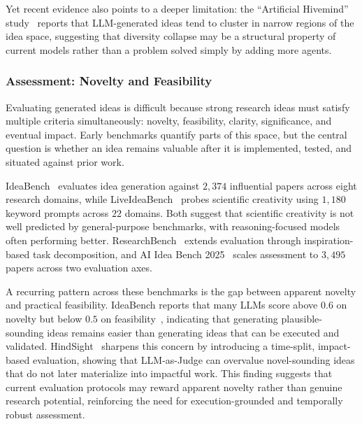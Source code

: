 \documentclass{llmxive}
\begin{document}
Yet recent evidence also points to a deeper limitation: the ``Artificial Hivemind'' study~\cite{jiang2025artificialhivemind} reports that LLM-generated ideas tend to cluster in narrow regions of the idea space, suggesting that diversity collapse may be a structural property of current models rather than a problem solved simply by adding more agents.



\subsubsection{Assessment: Novelty and Feasibility}
\label{sec:idea_eval}

Evaluating generated ideas is difficult because strong research ideas must satisfy multiple criteria simultaneously: novelty, feasibility, clarity, significance, and eventual impact. Early benchmarks quantify parts of this space, but the central question is whether an idea remains valuable after it is implemented, tested, and situated against prior work.

IdeaBench~\cite{guo2025ideabench} evaluates idea generation against $2{,}374$ influential papers across eight research domains, while LiveIdeaBench~\cite{liveideabench2024} probes scientific creativity using $1{,}180$ keyword prompts across $22$ domains. Both suggest that scientific creativity is not well predicted by general-purpose benchmarks, with reasoning-focused models often performing better. ResearchBench~\cite{researchbench2025} extends evaluation through inspiration-based task decomposition, and AI Idea Bench 2025~\cite{aiideabench2025} scales assessment to $3{,}495$ papers across two evaluation axes.

A recurring pattern across these benchmarks is the gap between apparent novelty and practical feasibility. IdeaBench reports that many LLMs score above $0.6$ on novelty but below $0.5$ on feasibility~\cite{guo2025ideabench}, indicating that generating plausible-sounding ideas remains easier than generating ideas that can be executed and validated. HindSight~\cite{hindsight2026} sharpens this concern by introducing a time-split, impact-based evaluation, showing that LLM-as-Judge can overvalue novel-sounding ideas that do not later materialize into impactful work. This finding suggests that current evaluation protocols may reward apparent novelty rather than genuine research potential, reinforcing the need for execution-grounded and temporally robust assessment.
\end{document}
